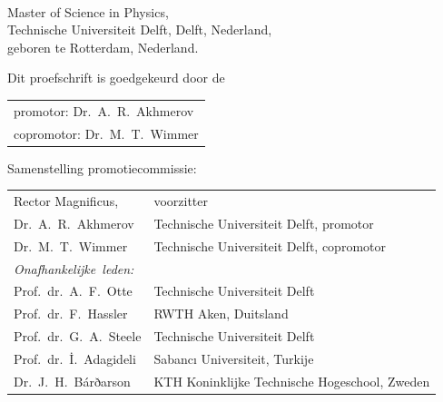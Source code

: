 \begin{titlepage}
\begin{center}
\makeatletter
{\Large\titlefont\bfseries\@firstname\ {\titleshape\@lastname}}
\makeatother

\bigskip
\bigskip

Master of Science in Physics, \\
Technische Universiteit Delft, Delft, Nederland, \\
geboren te Rotterdam, Nederland.

\vspace*{2\bigskipamount}

\end{center}

\clearpage
\thispagestyle{empty}

\noindent Dit proefschrift is goedgekeurd door de

\medskip\noindent
\begin{tabular}{l}
    promotor:  Dr.\ A.\ R.\ Akhmerov \\
    copromotor: Dr.\ M.\ T.\ Wimmer
\end{tabular}

\bigskip
\noindent Samenstelling promotiecommissie:

\medskip\noindent
\begin{tabular}{p{4cm}l}
    Rector Magnificus, & voorzitter \\
    Dr.\ A.\ R.\ Akhmerov & Technische Universiteit Delft, promotor \\
    Dr.\ M.\ T.\ Wimmer & Technische Universiteit Delft, copromotor \\

    \medskip
    \mbox{\emph{Onafhankelijke leden:}} & \\
    Prof.\ dr.\ A.\ F.\ Otte & Technische Universiteit Delft \\  %
    Prof.\ dr.\ F.\ Hassler & RWTH Aken, Duitsland \\  %
    Prof.\ dr.\ G.\ A.\ Steele & Technische Universiteit Delft \\  %
    Prof.\ dr.\ İ.\ Adagideli & Sabancı Universiteit, Turkije \\  %
    Dr.\ J.\ H.\ Bárðarson & KTH Koninklijke Technische Hogeschool, Zweden  %
    


\end{tabular}
\end{titlepage}
